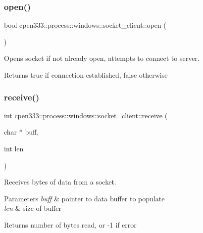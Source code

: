 \subsubsection{\texorpdfstring{open()}{open()}}
{\footnotesize\ttfamily bool cpen333\+::process\+::windows\+::socket\+\_\+client\+::open (\begin{DoxyParamCaption}{ }\end{DoxyParamCaption})\hspace{0.3cm}{\ttfamily [inline]}}



Opens socket if not already open, attempts to connect to server. 

\begin{DoxyReturn}{Returns}
true if connection established, false otherwise 
\end{DoxyReturn}
\mbox{\label{classcpen333_1_1process_1_1windows_1_1socket__client_acfe69fa942e33234b10dd926aac3b78c}} 
\subsubsection{\texorpdfstring{receive()}{receive()}}
{\footnotesize\ttfamily int cpen333\+::process\+::windows\+::socket\+\_\+client\+::receive (\begin{DoxyParamCaption}\item[{char $\ast$}]{buff,  }\item[{int}]{len }\end{DoxyParamCaption})\hspace{0.3cm}{\ttfamily [inline]}}



Receives bytes of data from a socket. 


\begin{DoxyParams}{Parameters}
{\em buff} & pointer to data buffer to populate \\
\hline
{\em len} & size of buffer \\
\hline
\end{DoxyParams}
\begin{DoxyReturn}{Returns}
number of bytes read, or -\/1 if error 
\end{DoxyReturn}
\mbox{\label{classcpen333_1_1process_1_1windows_1_1socket__client_a1407cc219cf5c4295fc0b6efbd42191a}} 
